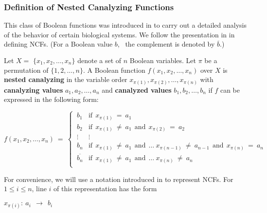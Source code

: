 \medskip

\subsubsection{Definition of Nested Canalyzing Functions}

\medskip

This class of Boolean functions 
was introduced in \cite{Kauffman-etal-2003} to carry out a detailed
analysis of the behavior of certain biological systems.
We follow the presentation in \cite{Layne-2011} in defining NCFs.
(For a Boolean value $b$,~ the complement is denoted by $\overline{b}$.)

\begin{definition}\label{def:nested_canalyzing}
Let $X = $ $\{x_1, x_2, \ldots, x_n\}$ denote a set of $n$  Boolean variables.
Let $\pi$ be a permutation of $\{1, 2, \ldots, n\}$.
A Boolean function $f(x_1, x_2, \ldots, x_n)$ over $X$ is \textbf{nested canalyzing}
in the variable order $x_{\pi(1)}, x_{\pi(2)}, \ldots, x_{\pi(n)}$ with
\textbf{canalyzing values} $a_1, a_2, \ldots, a_n$ and
\textbf{canalyzed values} $b_1, b_2, \ldots, b_n$
if $f$ can be expressed in the following form:

\medskip
\[
f(x_1, x_2, \ldots, x_n) ~=~ 
   \begin{cases}
       \:b_1 & \mathrm{if~~} x_{\pi(1)} ~=~ a_1 \\
       \:b_2 & \mathrm{if~~} x_{\pi(1)} ~\neq~ a_1 \mathrm{~~and~~}
            x_{\pi(2)} ~=~ a_2 \\
       \:\vdots & \vdots \\
       \:b_n & \mathrm{if~~} x_{\pi(1)} ~\neq~ a_1 \mathrm{~~and~~} \ldots~
             x_{\pi(n-1)} ~\neq~ a_{n-1} \mathrm{~~and~~} x_{\pi(n)} ~=~ a_n \\
       \:\overline{b_n} & \mathrm{if~~} x_{\pi(1)} ~\neq~ a_1 \mathrm{~~and~~} \ldots~
            x_{\pi(n)} ~\neq~ a_n \\
   \end{cases}
\]
\end{definition}

For convenience, we will use a notation introduced in \cite{Stearns-etal-2018}
to represent NCFs.
For $1 \leq i \leq n$, line $i$ of this representation has the form

\medskip

\noindent
\hspace*{1.1in} $x_{\pi(i)}:~ a_i ~~\longrightarrow~~ b_i$

\medskip


